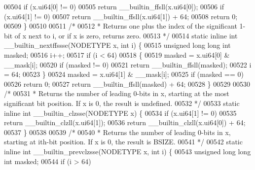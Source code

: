 \begin{DoxyCode}
00504         \textcolor{keywordflow}{if} (x.ui64[0] != 0)
00505                 \textcolor{keywordflow}{return} \_\_builtin\_ffsll(x.ui64[0]);
00506         \textcolor{keywordflow}{if} (x.ui64[1] != 0)
00507                 \textcolor{keywordflow}{return} \_\_builtin\_ffsll(x.ui64[1]) + 64;
00508         \textcolor{keywordflow}{return} 0;
00509 \}
00510 
00511 \textcolor{comment}{/*}
00512 \textcolor{comment}{ * Returns one plus the index of the significant 1-bit of x next to i, or if x is zero, returns zero.}
00513 \textcolor{comment}{ */}
00514 \textcolor{keyword}{static} \textcolor{keyword}{inline} \textcolor{keywordtype}{int} \_\_builtin\_nextffssse(NODETYPE x, \textcolor{keywordtype}{int} i) \{
00515         \textcolor{keywordtype}{unsigned} \textcolor{keywordtype}{long} \textcolor{keywordtype}{long} \textcolor{keywordtype}{int} masked;
00516         i++;
00517         \textcolor{keywordflow}{if} (i < 64)
00518         \{
00519                 masked = x.ui64[0] & \_\_mask[i];
00520                 \textcolor{keywordflow}{if} (masked != 0)
00521                         \textcolor{keywordflow}{return} \_\_builtin\_ffsll(masked);
00522                 i = 64;
00523         \}
00524         masked = x.ui64[1] & \_\_mask[i];
00525         \textcolor{keywordflow}{if} (masked == 0)
00526                 \textcolor{keywordflow}{return} 0;
00527         \textcolor{keywordflow}{return} \_\_builtin\_ffsll(masked) + 64;
00528 \}
00529 
00530 \textcolor{comment}{/*}
00531 \textcolor{comment}{ * Returns the number of leading 0-bits in x, starting at the most significant bit position. If x is 0, the
       result is undefined.}
00532 \textcolor{comment}{ */}
00533 \textcolor{keyword}{static} \textcolor{keyword}{inline} \textcolor{keywordtype}{int} \_\_builtin\_clzsse(NODETYPE x) \{
00534         \textcolor{keywordflow}{if} (x.ui64[1] != 0)
00535                 \textcolor{keywordflow}{return} \_\_builtin\_clzll(x.ui64[1]);
00536         \textcolor{keywordflow}{return} \_\_builtin\_clzll(x.ui64[0]) + 64;
00537 \}
00538 
00539 \textcolor{comment}{/*}
00540 \textcolor{comment}{ * Returns the number of leading 0-bits in x, starting at ith-bit position. If x is 0, the result is BSIZE.}
00541 \textcolor{comment}{ */}
00542 \textcolor{keyword}{static} \textcolor{keyword}{inline} \textcolor{keywordtype}{int} \_\_builtin\_prevclzsse(NODETYPE x, \textcolor{keywordtype}{int} i) \{
00543         \textcolor{keywordtype}{unsigned} \textcolor{keywordtype}{long} \textcolor{keywordtype}{long} \textcolor{keywordtype}{int} masked;
00544         \textcolor{keywordflow}{if} (i > 64)

\end{DoxyCode}
